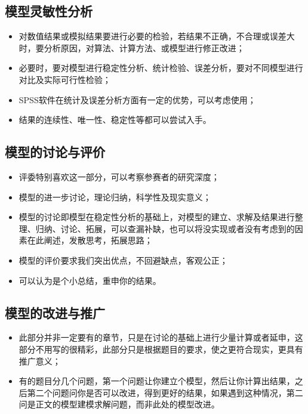 \documentclass[openany]{progbookcn}
\begin{document}
\subsection{模型灵敏性分析}
\begin{itemize}
    \item 对数值结果或模拟结果要进行必要的检验，若结果不正确，不合理或误差大时，要分析原因，对算法、计算方法、或模型进行修正改进；
    \item 必要时，要对模型进行稳定性分析、统计检验、误差分析，要对不同模型进行对比及实际可行性检验；
    \item SPSS软件在统计及误差分析方面有一定的优势，可以考虑使用；
    \item 结果的连续性、唯一性、稳定性等都可以尝试入手。
\end{itemize}
\subsection{模型的讨论与评价}
\begin{itemize}
    \item 评委特别喜欢这一部分，可以考察参赛者的研究深度；
    \item 模型的进一步讨论，理论归纳，科学性及现实意义；
    \item 模型的讨论即模型在稳定性分析的基础上，对模型的建立、求解及结果进行整理、归纳、讨论、拓展，可以查漏补缺，也可以将没实现或者没有考虑到的因素在此阐述，发散思考，拓展思路；
    \item 模型的评价要求我们突出优点，不回避缺点，客观公正；
    \item 可以认为是个小总结，重申你的结果。
\end{itemize}
\subsection{模型的改进与推广}
\begin{itemize}
    \item 此部分并非一定要有的章节，只是在讨论的基础上进行少量计算或者延申，这部分不用写的很精彩，此部分只是根据题目的要求，使之更符合现实，更具有推广意义；
    \item 有的题目分几个问题，第一个问题让你建立个模型，然后让你计算出结果，之后第二个问题问你是否可以改进，得到更好的结果，如果遇到这种情况，第二问是正文的模型建模求解问题，而非此处的模型改进。
\end{itemize}
\end{document}
